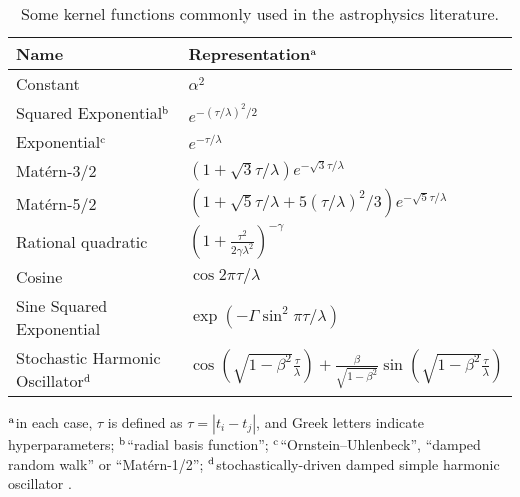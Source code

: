 \documentclass[letterpaper]{ar-1col}
\newcommand{\dt}{\ensuremath{\tau}}
\newcommand{\amplitude}{\ensuremath{\alpha}}
\newcommand{\lengthscale}{\ensuremath{\lambda}}
\begin{document}
\begin{table}[ht]
  \caption{Some kernel functions commonly used in the astrophysics literature. }
  \label{tab:kernels}
  \begin{center}
    \begin{tabular}{@{}l|l@{}}
      \hline
      Name                           &  Representation$^{\rm a}$                                    \\
      \hline
      Constant                       & $\amplitude^2$                                                     \\
      Squared Exponential$^{\rm b}$  & $e^{-(\dt/\lengthscale)^2/2}$                                              \\
      Exponential$^{\rm c}$          & $e^{-\dt/\lengthscale}$                                                  \\
      Mat\'ern-3/2                   & $\left(1 + \sqrt{3}\dt/\lengthscale\right)e^{-\sqrt{3}\dt/\lengthscale}$             \\
      Mat\'ern-5/2                   & $\left(1 + \sqrt{5}\dt/\lengthscale +5(\dt/\lengthscale)^2/3\right)e^{-\sqrt{5}\dt/\lengthscale}$  \\
      Rational quadratic             & $\left( 1 + \frac{\dt^2}{2 \gamma\lengthscale^2} \right)^{-\gamma}$ \\
      Cosine                         & $\cos 2\pi\dt/\lengthscale$                                                  \\
      Sine Squared Exponential       & $\exp\left(-\Gamma\sin^2\pi\dt/\lengthscale\right)$                      \\
      Stochastic Harmonic Oscillator$^{\rm d}$ & $\cos\left(\sqrt{1-\beta^2}\frac{\dt}{\lengthscale}\right) + \frac{\beta}{\sqrt{1-\beta^2}}\sin\left(\sqrt{1-\beta^2}\frac{\dt}{\lengthscale}\right)$                          \\
      \hline
    \end{tabular}
  \end{center}
  \begin{tabnote}
    $^{\rm a}$in each case, $\dt$ is defined as $\dt = \left|t_i - t_j\right|$, and Greek letters indicate hyperparameters;
    $^{\rm b}$``radial basis function'';
    $^{\rm c}$``Ornstein--Uhlenbeck'', ``damped random walk'' or ``Mat\'ern-1/2'';
    $^{\rm d}$stochastically-driven damped simple harmonic oscillator \citep{celerite}.
  \end{tabnote}
\end{table}
\end{document}
